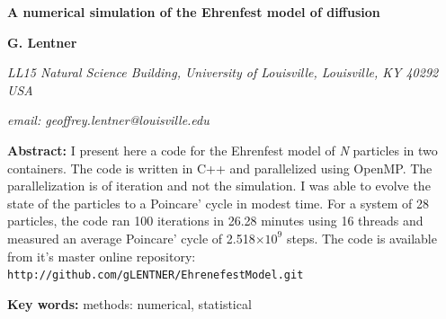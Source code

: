 



	
	\thispagestyle{plain}

	\begin{flushleft}
		\LARGE{\textbf{A numerical simulation of the Ehrenfest model of diffusion}}
	\end{flushleft}
	
	\noindent\makebox[\linewidth]{\rule{\textwidth}{0.5pt}}

	\bigskip
		
	\begin{flushright}
	\begin{minipage}[t]{0.85\textwidth}	
		\par{\Large{\textbf{G. Lentner}}\par}
		\bigskip
		\par{\small{\textit{
				LL15 Natural Science Building, University of Louisville,
				Louisville, KY 40292 USA}}\par}
		\par{\small{\textit{
				email: geoffrey.lentner@louisville.edu}}\par}
	\end{minipage}
	\end{flushright}

	\vspace{\baselineskip}

	\begin{flushright}
	\begin{minipage}[t]{0.85\textwidth}
		\textbf{Abstract: } I present here a code for the Ehrenfest model of  \textit{N} 
		particles in two containers. The code is written in C++ and parallelized using
		OpenMP. The parallelization is of iteration and not the simulation. I was able to
		evolve the state of the particles to a Poincare' cycle in modest time. For a 
		system of 28 particles, the code ran 100 iterations in 26.28 minutes using 16 
		threads and measured an average Poincare' cycle of 2.518$\times10^9$ steps. 
		The code is available from it's master online repository: 
		\texttt{\small http://github.com/gLENTNER/EhrenefestModel.git}
	\end{minipage}
	\end{flushright}

	\begin{flushright}
	\begin{minipage}[t]{0.85\textwidth}
		\par{\small{\textbf{Key words: } methods: numerical, statistical}\par}
	\end{minipage}
	\end{flushright}

